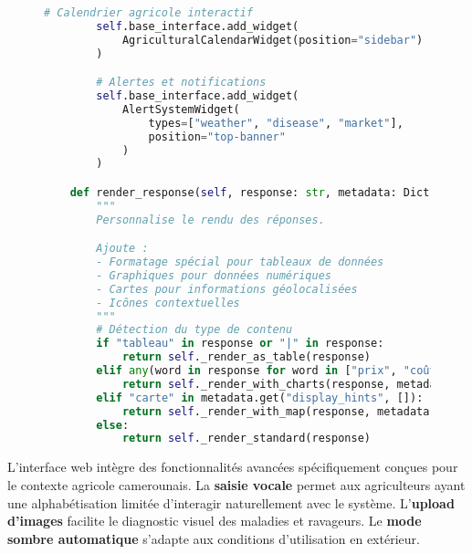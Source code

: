 \begin{figure}[h]
\begin{lstlisting}[language=Python, caption=Configuration de l'interface web ADK]
        # Calendrier agricole interactif
        self.base_interface.add_widget(
            AgriculturalCalendarWidget(position="sidebar")
        )

        # Alertes et notifications
        self.base_interface.add_widget(
            AlertSystemWidget(
                types=["weather", "disease", "market"],
                position="top-banner"
            )
        )

    def render_response(self, response: str, metadata: Dict) -> str:
        """
        Personnalise le rendu des réponses.

        Ajoute :
        - Formatage spécial pour tableaux de données
        - Graphiques pour données numériques
        - Cartes pour informations géolocalisées
        - Icônes contextuelles
        """
        # Détection du type de contenu
        if "tableau" in response or "|" in response:
            return self._render_as_table(response)
        elif any(word in response for word in ["prix", "coût", "FCFA"]):
            return self._render_with_charts(response, metadata)
        elif "carte" in metadata.get("display_hints", []):
            return self._render_with_map(response, metadata)
        else:
            return self._render_standard(response)
\end{lstlisting}
\end{figure}

L'interface web intègre des fonctionnalités avancées spécifiquement conçues pour le contexte agricole camerounais. La \textbf{saisie vocale} permet aux agriculteurs ayant une alphabétisation limitée d'interagir naturellement avec le système. L'\textbf{upload d'images} facilite le diagnostic visuel des maladies et ravageurs. Le \textbf{mode sombre automatique} s'adapte aux conditions d'utilisation en extérieur.

